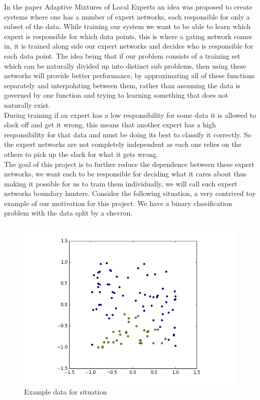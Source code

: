 \documentclass[notitlepage]{report}
\theoremstyle{definition}
\begin{document}
In the paper Adaptive Mixtures of Local Experts \cite{jacobs1991adaptive} an idea was proposed to create systems where one has a number of expert networks, each responsible for only a subset of the data. While training our system we want to be able to learn which expert is responsible for which data points, this is where a gating network comes in, it is trained along side our expert networks and decides who is responsible for each data point. The idea being that if our problem consists of a training set which can be naturally divided up into distinct sub problems, then using these networks will provide better performance, by approximating all of these functions separately and interpolating between them, rather than assuming the data is governed by one function and trying to learning something that does not naturally exist.\\

During training if an expert has a low responsibility for some data it is allowed to slack off and get it wrong, this means that another expert has a high responsibility for that data and must be doing its best to classify it correctly. So the expert networks are not completely independent as each one relies on the others to pick up the slack for what it gets wrong.\\

The goal of this project is to further reduce the dependence between these expert networks, we want each to be responsible for deciding what it cares about thus making it possible for us to train them individually, we will call such expert networks boundary hunters. Consider the following situation, a very contrived toy example of our motivation for this project. We have a binary classification problem with the data split by a chevron. 

\begin{figure}[H]
	\centering
	\begin{minipage}[b]{0.8\textwidth}
		\includegraphics[width=\textwidth]{CHEV-DATA-EX.png}
		\caption{Example data for situation}
	\end{minipage}
	\hfill
\end{figure}
\end{document}

